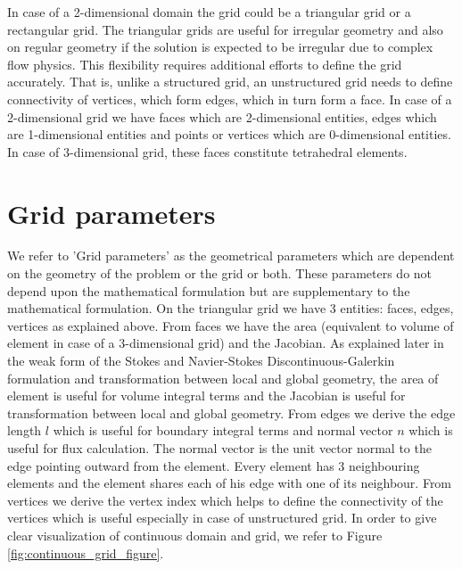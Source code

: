 \documentclass[a4paper,oneside,openright,spanish,english]{book}
\begin{document}
In case of a 2-dimensional domain the grid could be a triangular grid or a rectangular grid. The triangular grids are useful for irregular geometry and also on regular geometry if the solution is expected to be irregular due to complex flow physics. This flexibility requires additional efforts to define the grid accurately. That is, unlike a structured grid, an unstructured grid needs to define connectivity of vertices, which form edges, which in turn form a face. In case of a 2-dimensional grid we have faces which are 2-dimensional entities, edges which are 1-dimensional entities and points or vertices which are 0-dimensional entities. In case of 3-dimensional grid, these faces constitute tetrahedral elements. 

\section{Grid parameters}

We refer to 'Grid parameters' as the geometrical parameters which are dependent on the geometry of the problem or the grid or both. These parameters do not depend upon the mathematical formulation but are supplementary to the mathematical formulation. On the triangular grid we have 3 entities: faces, edges, vertices as explained above. From faces we have the area (equivalent to volume of element in case of a 3-dimensional grid) and the Jacobian. As explained later in the weak form of the Stokes and Navier-Stokes Discontinuous-Galerkin formulation and transformation between local and global geometry, the area of element is useful for volume integral terms and the Jacobian is useful for transformation between local and global geometry. From edges we derive the edge length $l$ which is useful for boundary integral terms and normal vector $n$ which is useful for flux calculation. The normal vector is the unit vector normal to the edge pointing outward from the element. Every element has 3 neighbouring elements and the element shares each of his edge with one of its neighbour. From vertices we derive the vertex index which helps to define the connectivity of the vertices which is useful especially in case of unstructured grid. In order to give clear visualization of continuous domain and grid, we refer to Figure \ref{fig:continuous_grid_figure}.
\end{document}
